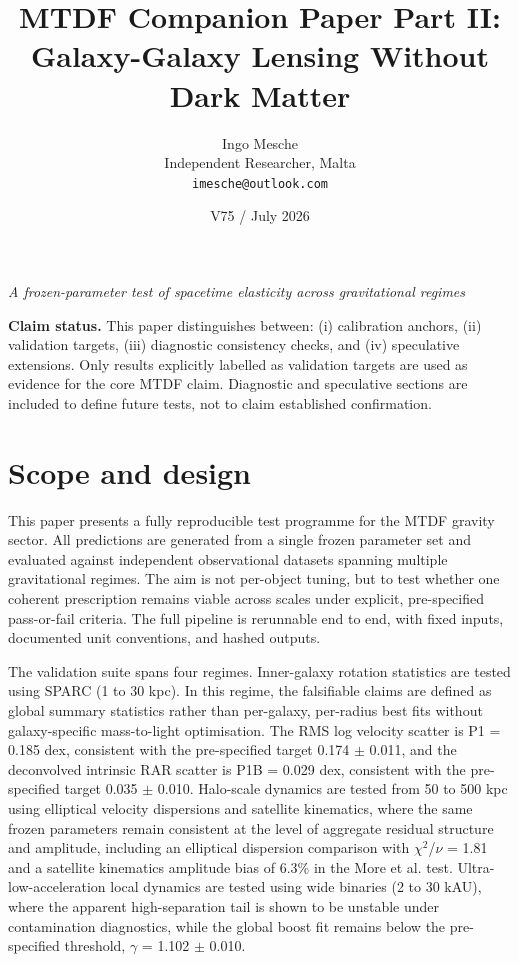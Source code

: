 \documentclass[11pt,a4paper]{article}
\title{MTDF Companion Paper Part II: Galaxy-Galaxy Lensing Without Dark Matter}
\author{Ingo Mesche\\ \small Independent Researcher, Malta \\ \small \texttt{imesche@outlook.com}}
\date{V75 / July 2026}
\begin{document}
\maketitle
\begin{center}\itshape A frozen-parameter test of spacetime elasticity across gravitational regimes\end{center}



\tableofcontents

\begin{mdframed}[linecolor=accent,linewidth=0.5pt,backgroundcolor=callout-bg,leftline=true,rightline=true,topline=true,bottomline=true,innerleftmargin=8pt,innerrightmargin=8pt,innertopmargin=6pt,innerbottommargin=6pt]
\textbf{Claim status.}
This paper distinguishes between:
(i) calibration anchors,
(ii) validation targets,
(iii) diagnostic consistency checks, and
(iv) speculative extensions.
Only results explicitly labelled as validation targets are used as evidence for the core MTDF claim. Diagnostic and speculative sections are included to define future tests, not to claim established confirmation.
\end{mdframed}


\section{Scope and design}
\label{sec:scope}
This paper presents a fully reproducible test programme for the MTDF gravity sector. All predictions are generated from a single frozen parameter set and evaluated against independent observational datasets spanning multiple gravitational regimes. The aim is not per-object tuning, but to test whether one coherent prescription remains viable across scales under explicit, pre-specified pass-or-fail criteria. The full pipeline is rerunnable end to end, with fixed inputs, documented unit conventions, and hashed outputs.

The validation suite spans four regimes. Inner-galaxy rotation statistics are tested using SPARC (1 to 30 kpc). In this regime, the falsifiable claims are defined as global summary statistics rather than per-galaxy, per-radius best fits without galaxy-specific mass-to-light optimisation. The RMS log velocity scatter is P1 = 0.185 dex, consistent with the pre-specified target 0.174 $\pm$ 0.011, and the deconvolved intrinsic RAR scatter is P1B = 0.029 dex, consistent with the pre-specified target 0.035 $\pm$ 0.010. Halo-scale dynamics are tested from 50 to 500 kpc using elliptical velocity dispersions and satellite kinematics, where the same frozen parameters remain consistent at the level of aggregate residual structure and amplitude, including an elliptical dispersion comparison with $\chi$$^{2}$/$\nu$ = 1.81 and a satellite kinematics amplitude bias of 6.3\% in the More et al. test. Ultra-low-acceleration local dynamics are tested using wide binaries (2 to 30 kAU), where the apparent high-separation tail is shown to be unstable under contamination diagnostics, while the global boost fit remains below the pre-specified threshold, $\gamma$ = 1.102 $\pm$ 0.010.
\end{document}
